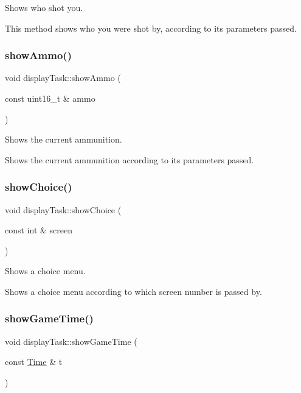 Shows who shot you. 

This method shows who you were shot by, according to its parameters passed. \mbox{\label{classdisplay_task_a8cbad9cd4eb7783c2619550bb5e9fe04}} 
\subsubsection{\texorpdfstring{show\+Ammo()}{showAmmo()}}
{\footnotesize\ttfamily void display\+Task\+::show\+Ammo (\begin{DoxyParamCaption}\item[{const uint16\+\_\+t \&}]{ammo }\end{DoxyParamCaption})}



Shows the current ammunition. 

Shows the current ammunition according to its parameters passed. \mbox{\label{classdisplay_task_ad34fd92a96e6aa1017db7a6af2ca2125}} 
\subsubsection{\texorpdfstring{show\+Choice()}{showChoice()}}
{\footnotesize\ttfamily void display\+Task\+::show\+Choice (\begin{DoxyParamCaption}\item[{const int \&}]{screen }\end{DoxyParamCaption})}



Shows a choice menu. 

Shows a choice menu according to which screen number is passed by. \mbox{\label{classdisplay_task_a367b1904f141adf0817c16ad8fb1eb44}} 
\subsubsection{\texorpdfstring{show\+Game\+Time()}{showGameTime()}}
{\footnotesize\ttfamily void display\+Task\+::show\+Game\+Time (\begin{DoxyParamCaption}\item[{const \mbox{\hyperlink{class_time}{Time}} \&}]{t }\end{DoxyParamCaption})}



